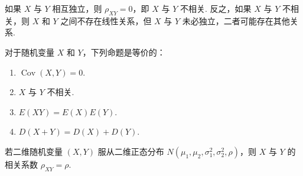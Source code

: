 如果 $X$ 与 $Y$ 相互独立，则 $\rho_{XY} = 0$，即 $X$ 与 $Y$ 不相关. 反之，如果 $X$ 与 $Y$ 不相关，则 $X$ 和 $Y$ 之间不存在线性关系，但 $X$ 与 $Y$ 未必独立，二者可能存在其他关系.

对于随机变量 $X$ 和 $Y$，下列命题是等价的：
\begin{enumerate}
    \item $\operatorname{Cov}(X,Y) = 0$.
    \item $X$ 与 $Y$ 不相关.
    \item $E(XY) = E(X) E(Y)$.
    \item $D(X+Y) = D(X) + D(Y)$.
\end{enumerate}

\begin{conclusion}
    若二维随机变量 $(X,Y)$ 服从二维正态分布 $N(\mu_1,\mu_2,\sigma_1^2,\sigma_2^2,\rho)$，则 $X$ 与 $Y$ 的相关系数 $\rho_{XY} = \rho$.
\end{conclusion}

